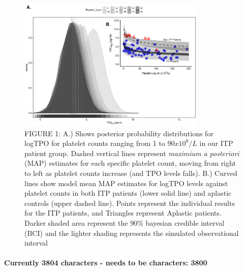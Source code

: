 \documentclass[11pt]{article}
\begin{document}
\begin{figure}
\includegraphics[width=0.8\textwidth]{ABS_v4_g1.pdf}
\caption {FIGURE 1: A.) Shows posterior probability distributions for logTPO for platelet counts ranging from 1 to 90$x10^9/L$ in our ITP patient group. Dashed vertical lines represent \textit{maximium a posteriori} (MAP) estimates for each specific platelet count, moving from right to left as platelet counts increase (and TPO levels falls). B.) Curved lines show model mean MAP estimates for logTPO levels against platelet counts in both ITP patients (lower solid line) and aplastic controls (upper dashed line). Points represent the individual results for the ITP patients, and Triangles represent Aplastic patients. Darker shaded area represent the 90\% bayesian credible interval (BCI) and the lighter shading represents the simulated observational interval}
\end{figure}





\paragraph{}
\textbf{Currently 3804 characters - needs to be characters: 3800}
\end{document}

